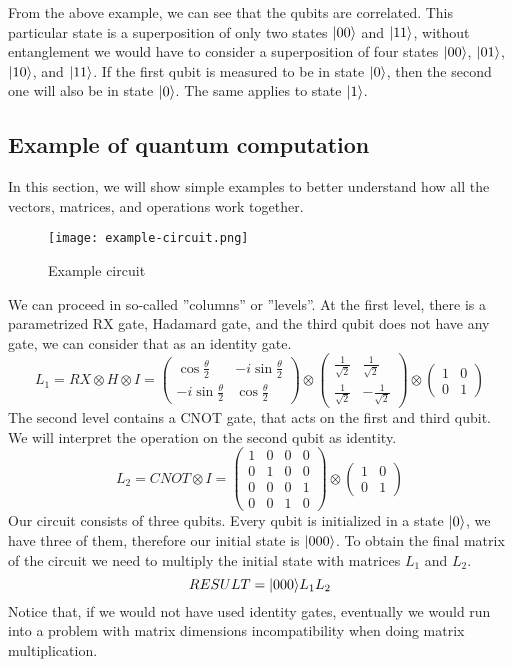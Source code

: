 \noindent From the above example, we can see that the qubits are correlated. This particular state is a superposition of only two states $\lvert00\rangle$ and $\lvert11\rangle$, without entanglement we would have to consider a superposition of four states $\lvert00\rangle$, $\lvert01\rangle$, $\lvert10\rangle$, and $\lvert11\rangle$. If the first qubit is measured to be in state $\lvert0\rangle$, then the second one will also be in state $\lvert0\rangle$. The same applies to state $\lvert1\rangle$.

\subsection{Example of quantum computation}
In this section, we will show simple examples to better understand how all the vectors, matrices, and operations work together.

\begin{figure}[H]
    \begin{center}
       \texttt{[image: example-circuit.png]}
       \caption{Example circuit}
    \end{center}
\end{figure}

We can proceed in so-called ''columns'' or ''levels''.
At the first level, there is a parametrized RX gate, Hadamard gate, and the third qubit does not have any gate, we can consider that as an identity gate.
$$L_1 = RX \otimes H \otimes I = \begin{pmatrix} 
\cos{\frac{\theta}{2}} & -i\sin{\frac{\theta}{2}} \\
-i\sin{\frac{\theta}{2}} & \cos{\frac{\theta}{2}}
\end{pmatrix} \otimes \begin{pmatrix} 
\frac{1}{\sqrt{2}} &  \frac{1}{\sqrt{2}}  \\
\frac{1}{\sqrt{2}}  &  -\frac{1}{\sqrt{2}} 
\end{pmatrix} \otimes \begin{pmatrix} 
1 & 0 \\
0 & 1
\end{pmatrix}$$
The second level contains a CNOT gate, that acts on the first and third qubit. We will interpret the operation on the second qubit as identity. 
$$ L_2 = CNOT \otimes I = \begin{pmatrix}
1 & 0 & 0 & 0 \\
0 & 1 & 0 & 0 \\
0 & 0 & 0 & 1 \\
0 & 0 & 1 & 0
\end{pmatrix}\otimes\begin{pmatrix} 
1 & 0 \\
0 & 1
\end{pmatrix}$$
Our circuit consists of three qubits. Every qubit is initialized in a state $\lvert0\rangle$, we have three of them, therefore our initial state is $\lvert000\rangle$. To obtain the final matrix of the circuit we need to multiply the initial state with matrices $L_1$ and $L_2$.
$$RESULT = \lvert000\rangle L_{1}L_2$$
Notice that, if we would not have used identity gates, eventually we would run into a problem with matrix dimensions incompatibility when doing matrix multiplication.
